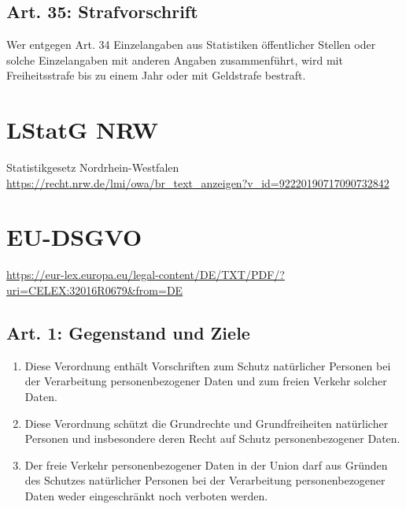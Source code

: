 \documentclass[A4, 12pt]{scrbook}
\begin{document}
    \section{Art. 35: Strafvorschrift}
        Wer entgegen Art. 34 Einzelangaben aus Statistiken öffentlicher Stellen oder solche Einzelangaben mit anderen Angaben zusammenführt, wird mit Freiheitsstrafe bis zu einem Jahr oder mit Geldstrafe bestraft.

\chapter{LStatG NRW}{Statistikgesetz Nordrhein-Westfalen}
\newline
\url{https://recht.nrw.de/lmi/owa/br_text_anzeigen?v_id=92220190717090732842}




\chapter{EU-DSGVO}
\newline
\url{https://eur-lex.europa.eu/legal-content/DE/TXT/PDF/?uri=CELEX:32016R0679&from=DE}
    \section{Art. 1: Gegenstand und Ziele}
        \begin{enumerate}[label=(\arabic*)]
            \item Diese Verordnung enthält Vorschriften zum Schutz natürlicher Personen bei der Verarbeitung personenbezogener Daten und zum freien Verkehr solcher Daten.
            \item Diese Verordnung schützt die Grundrechte und Grundfreiheiten natürlicher Personen und insbesondere deren Recht auf Schutz personenbezogener Daten.
            \item Der freie Verkehr personenbezogener Daten in der Union darf aus Gründen des Schutzes natürlicher Personen bei der Verarbeitung personenbezogener Daten weder eingeschränkt noch verboten werden. 
        \end{enumerate}
\end{document}
